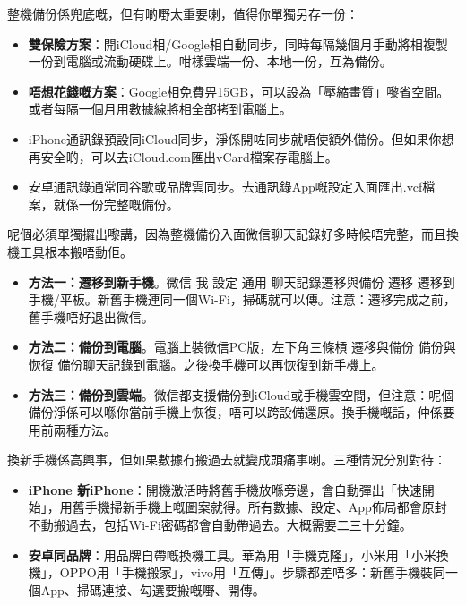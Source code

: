 
整機備份係兜底嘅，但有啲嘢太重要喇，值得你單獨另存一份：


\begin{itemize}
  \item \textbf{雙保險方案}：開iCloud相/Google相自動同步，同時每隔幾個月手動將相複製一份到電腦或流動硬碟上。咁樣雲端一份、本地一份，互為備份。
  \item \textbf{唔想花錢嘅方案}：Google相免費畀15GB，可以設為「壓縮畫質」嚟省空間。或者每隔一個月用數據線將相全部拷到電腦上。
\end{itemize}


\begin{itemize}
  \item iPhone通訊錄預設同iCloud同步，淨係開咗同步就唔使額外備份。但如果你想再安全啲，可以去iCloud.com匯出vCard檔案存電腦上。
  \item 安卓通訊錄通常同谷歌或品牌雲同步。去通訊錄App嘅設定入面匯出.vcf檔案，就係一份完整嘅備份。
\end{itemize}


呢個必須單獨攞出嚟講，因為整機備份入面微信聊天記錄好多時候唔完整，而且換機工具根本搬唔動佢。

\begin{itemize}
  \item \textbf{方法一：遷移到新手機}。微信 我 設定 通用 聊天記錄遷移與備份 遷移 遷移到手機/平板。新舊手機連同一個Wi-Fi，掃碼就可以傳。注意：遷移完成之前，舊手機唔好退出微信。
  \item \textbf{方法二：備份到電腦}。電腦上裝微信PC版，左下角三條槓 遷移與備份 備份與恢復 備份聊天記錄到電腦。之後換手機可以再恢復到新手機上。
  \item \textbf{方法三：備份到雲端}。微信都支援備份到iCloud或手機雲空間，但注意：呢個備份淨係可以喺你當前手機上恢復，唔可以跨設備還原。換手機嘅話，仲係要用前兩種方法。
\end{itemize}


換新手機係高興事，但如果數據冇搬過去就變成頭痛事喇。三種情況分別對待：


\begin{itemize}
  \item \textbf{iPhone 新iPhone}：開機激活時將舊手機放喺旁邊，會自動彈出「快速開始」，用舊手機掃新手機上嘅圖案就得。所有數據、設定、App佈局都會原封不動搬過去，包括Wi-Fi密碼都會自動帶過去。大概需要二三十分鐘。
  \item \textbf{安卓同品牌}：用品牌自帶嘅換機工具。華為用「手機克隆」，小米用「小米換機」，OPPO用「手機搬家」，vivo用「互傳」。步驟都差唔多：新舊手機裝同一個App、掃碼連接、勾選要搬嘅嘢、開傳。
\end{itemize}

